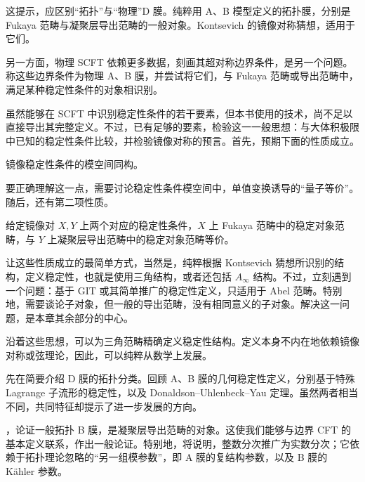 这提示，应区别“拓扑”与“物理”D 膜。纯粹用 A、B 模型定义的拓扑膜，分别是 Fukaya 范畴与凝聚层导出范畴的一般对象。Kontsevich 的镜像对称猜想，适用于它们。

另一方面，物理 SCFT 依赖更多数据，刻画其超对称边界条件，是另一个问题。称这些边界条件为物理 A、B 膜，并尝试将它们，与 Fukaya 范畴或导出范畴中，满足某种稳定性条件的对象相识别。

虽然能够在 SCFT 中识别稳定性条件的若干要素，但本书使用的技术，尚不足以直接导出其完整定义。不过，已有足够的要素，检验这一一般思想：与大体积极限中已知的稳定性条件比较，并检验镜像对称的预言。首先，预期下面的性质成立。
\begin{property}\label{property:5.1}\label{pty:5.1}
镜像稳定性条件的模空间同构。
\end{property}

要正确理解这一点，需要讨论稳定性条件模空间中，单值变换诱导的“量子等价”。随后，还有第二项性质。
\begin{property}\label{property:5.2}\label{pty:5.2}
给定镜像对 $X,Y$ 上两个对应的稳定性条件，$X$ 上 Fukaya 范畴中的稳定对象范畴，与 $Y$ 上凝聚层导出范畴中的稳定对象范畴等价。
\end{property}

让这些性质成立的最简单方式，当然是，纯粹根据 Kontsevich 猜想所识别的结构，定义稳定性，也就是使用三角结构，或者还包括 $A_\infty$ 结构。不过，立刻遇到一个问题：基于 GIT 或其简单推广的稳定性定义，只适用于 Abel 范畴。特别地，需要谈论子对象，但一般的导出范畴，没有相同意义的子对象。解决这一问题，是本章其余部分的中心。

沿着这些思想，可以为三角范畴精确定义稳定性结构。定义本身不内在地依赖镜像对称或弦理论，因此，可以纯粹从数学上发展。

先在简要介绍 D 膜的拓扑分类。回顾 A、B 膜的几何稳定性定义，分别基于特殊 Lagrange 子流形的稳定性，以及 Donaldson--Uhlenbeck--Yau 定理。虽然两者相当不同，共同特征却提示了进一步发展的方向。

，论证一般拓扑 B 膜，是凝聚层导出范畴的对象。这使我们能够与边界 CFT 的基本定义联系，作出一般论证。特别地，将说明，整数分次推广为实数分次；它依赖于拓扑理论忽略的“另一组模参数”，即 A 膜的复结构参数，以及 B 膜的 K\"ahler 参数。

